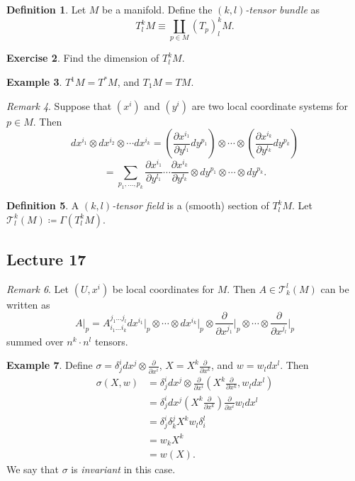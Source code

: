 \documentclass[10pt,letterpaper,cm]{nupset}
\theoremstyle{definition}
\newtheorem{definition}{Definition}[subsection]
\newtheorem{exmp}[definition]{Example}
\theoremstyle{theorem}
\newtheorem{exercise}[definition]{Exercise}
\theoremstyle{remark}
\newtheorem{remark}[definition]{Remark}
\newcommand{\T}{\mathcal T}
\newcommand{\1}{\mathbf{1}}
\newcommand{\0}{\vec 0}
\begin{document}
\begin{definition}
Let $M$ be a manifold. Define the \textit{$(k, l)$-tensor bundle} as $$T _l^k M \equiv \coprod_{p\in M} (T_p)_l^k M.$$
\end{definition}

\begin{exercise}
Find the dimension of $T_l^k M$.
\end{exercise}

\begin{exmp}
$T^1 M = T^{\ast}M$, and $T_1 M = TM$.
\end{exmp}

\begin{remark}
Suppose that $\left(x^i\right)$ and $\left(y^i\right)$ are two local coordinate systems for $p\in M$. Then $$dx^{i_1} \otimes dx^{i_2} \otimes \cdots dx^{i_k} = \left(\frac{\partial{x^{i_1}}}{\partial{y^{l_1}}} dy^{p_1}\right) \otimes \cdots \otimes \left(\frac{\partial{x^{i_k}}}{\partial{y^{l_k}}} dy^{p_k}\right)$$ $$ = \sum_{p_1, \ldots, p_k} \frac{\partial{x^{i_1}}}{\partial{y^{l_1}}}\cdots \frac{\partial{x^{i_k}}}{\partial{y^{l_k}}}  \otimes dy^{p_1} \otimes \cdots \otimes dy^{p_k}.$$
\end{remark}

\begin{definition}
A \textit{$(k, l)$-tensor field} is a (smooth) section of $T_l^kM$. Let $\T_l^k(M)\coloneqq  \Gamma(T_l^kM)$.
\end{definition}

\subsection{Lecture 17}

\begin{remark}
Let $(U, x^i)$ be local coordinates for $M$. Then $A \in \T_k^l(M)$ can be written as $$A\bigr\rvert_p = A_{i_1 \ldots i_k}^{j_1\ldots j_l} dx^{i_1}\bigr\rvert_p \otimes \cdots \otimes dx^{i_k}\bigr\rvert_p \otimes \frac{\partial}{\partial{x^{j_1}}}\bigr\rvert_p \otimes \cdots \otimes \frac{\partial}{\partial{x^{j_l}}}\bigr\rvert_p$$ summed over $n^k\cdot n^l$ tensors.
\end{remark}

\begin{exmp}
Define $\sigma = \delta_j^i dx^j \otimes \frac{\partial}{\partial{x^i}}$, $X = X^k \frac{\partial}{\partial{x^k}}$, and $w = w_ldx^l$. Then 
\begin{align*}
\sigma(X, w) & = \delta_j^i dx^j \otimes \frac{\partial}{\partial{x^i}}(X^k \frac{\partial}{\partial{x^k}}, w_ldx^l) 
\\ & = \delta_j^i dx^j (X^k \frac{\partial}{\partial{x^k}}) \frac{\partial}{\partial{x^i}} w_ldx^l 
\\ & = \delta_j^i \delta_k^j X^k w_l\delta_i^l 
\\ & = w_kX^k
\\ & = w(X).
\end{align*}
 We say that $\sigma$ is \textit{invariant} in this case.
\end{exmp}
\end{document}
